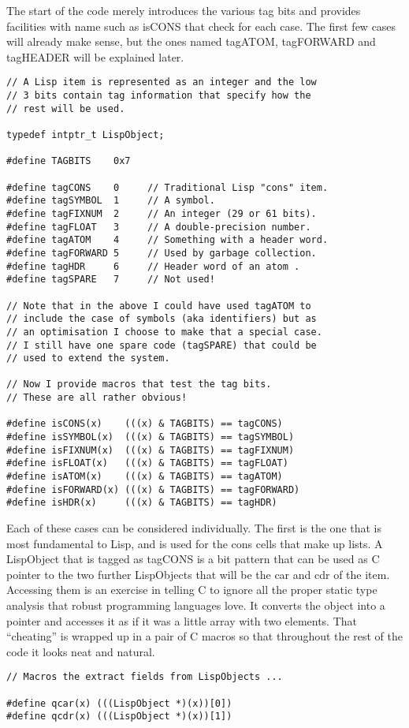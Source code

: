 The start of the code merely introduces the various tag bits
and provides facilities with name such as {\tx isCONS} that check
for each case. The first few cases will already make sense, but the
ones named {\tx tagATOM}, {\tx tagFORWARD} and {\tx tagHEADER} will be
explained later.
{\small\begin{verbatim}
// A Lisp item is represented as an integer and the low
// 3 bits contain tag information that specify how the
// rest will be used.

typedef intptr_t LispObject;

#define TAGBITS    0x7

#define tagCONS    0     // Traditional Lisp "cons" item.
#define tagSYMBOL  1     // A symbol.
#define tagFIXNUM  2     // An integer (29 or 61 bits).
#define tagFLOAT   3     // A double-precision number.
#define tagATOM    4     // Something with a header word.
#define tagFORWARD 5     // Used by garbage collection.
#define tagHDR     6     // Header word of an atom .
#define tagSPARE   7     // Not used!

// Note that in the above I could have used tagATOM to
// include the case of symbols (aka identifiers) but as
// an optimisation I choose to make that a special case.
// I still have one spare code (tagSPARE) that could be
// used to extend the system.

// Now I provide macros that test the tag bits.
// These are all rather obvious!

#define isCONS(x)    (((x) & TAGBITS) == tagCONS)
#define isSYMBOL(x)  (((x) & TAGBITS) == tagSYMBOL)
#define isFIXNUM(x)  (((x) & TAGBITS) == tagFIXNUM)
#define isFLOAT(x)   (((x) & TAGBITS) == tagFLOAT)
#define isATOM(x)    (((x) & TAGBITS) == tagATOM)
#define isFORWARD(x) (((x) & TAGBITS) == tagFORWARD)
#define isHDR(x)     (((x) & TAGBITS) == tagHDR)
\end{verbatim}}

Each of these cases can be considered individually. The first is the
one that is most fundamental to Lisp, and is used for the {\tx cons} cells
that make up lists. A {\tx LispObject} that is tagged as {\tx tagCONS}
is a bit pattern that can be used as C pointer to the two further
{\tx LispObject}s that will be the {\tx car} and {\tx cdr} of the item.
Accessing them is an exercise in telling C to ignore all the proper static
type analysis that robust programming languages love. It converts the
object into a pointer and accesses it as if it was a little array with
two elements. That ``cheating'' is wrapped up in a pair of C macros
so that throughout the rest of the code it looks neat and natural.
{\small\begin{verbatim}
// Macros the extract fields from LispObjects ...

#define qcar(x) (((LispObject *)(x))[0])
#define qcdr(x) (((LispObject *)(x))[1])
\end{verbatim}}

